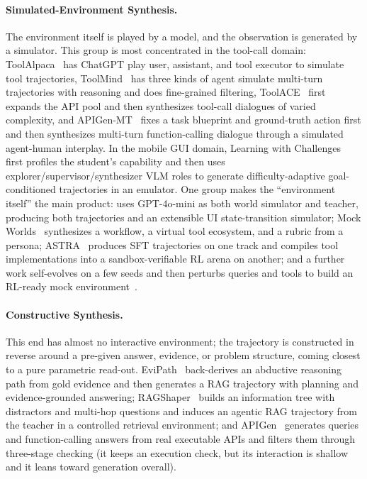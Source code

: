 \paragraph{Simulated-Environment Synthesis.} The environment itself is played by a model, and the observation is generated by a simulator. This group is most concentrated in the tool-call domain: ToolAlpaca~\cite{Tan23} has ChatGPT play user, assistant, and tool executor to simulate tool trajectories, ToolMind~\cite{Yan25ab} has three kinds of agent simulate multi-turn trajectories with reasoning and does fine-grained filtering, ToolACE~\cite{Liu24o} first expands the API pool and then synthesizes tool-call dialogues of varied complexity, and APIGen-MT~\cite{Pra25b} fixes a task blueprint and ground-truth action first and then synthesizes multi-turn function-calling dialogue through a simulated agent-human interplay. In the mobile GUI domain, Learning with Challenges~\cite{Kan26b} first profiles the student's capability and then uses explorer/supervisor/synthesizer VLM roles to generate difficulty-adaptive goal-conditioned trajectories in an emulator. One group makes the ``environment itself'' the main product: \cite{Wan25as} uses GPT-4o-mini as both world simulator and teacher, producing both trajectories and an extensible UI state-transition simulator; Mock Worlds~\cite{Lu26j} synthesizes a workflow, a virtual tool ecosystem, and a rubric from a persona; ASTRA~\cite{Tia26} produces SFT trajectories on one track and compiles tool implementations into a sandbox-verifiable RL arena on another; and a further work self-evolves on a few seeds and then perturbs queries and tools to build an RL-ready mock environment~\cite{Xu26e}.

\paragraph{Constructive Synthesis.} This end has almost no interactive environment; the trajectory is constructed in reverse around a pre-given answer, evidence, or problem structure, coming closest to a pure parametric read-out. EviPath~\cite{Li25at} back-derives an abductive reasoning path from gold evidence and then generates a RAG trajectory with planning and evidence-grounded answering; RAGShaper~\cite{Tao26} builds an information tree with distractors and multi-hop questions and induces an agentic RAG trajectory from the teacher in a controlled retrieval environment; and APIGen~\cite{Liu24n} generates queries and function-calling answers from real executable APIs and filters them through three-stage checking (it keeps an execution check, but its interaction is shallow and it leans toward generation overall).

